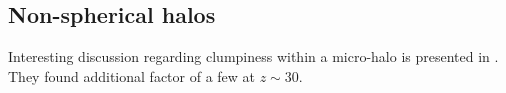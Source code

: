 \subsection{Non-spherical halos}
Interesting discussion regarding clumpiness within a micro-halo is presented in \citet{Anderhalden_2013}. They found additional factor of a few at $z \sim 30$.